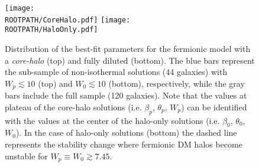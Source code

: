 \begin{figure}
	\centering%
	\texttt{[image: \\ROOTPATH/CoreHalo.pdf]}
	\texttt{[image: \\ROOTPATH/HaloOnly.pdf]}
	\caption{Distribution of the best-fit parameters for the fermionic model with a \textit{core-halo} (top) and fully diluted (bottom). The blue bars represent the sub-sample of non-isothermal solutions (44 galaxies) with $W_p \lesssim 10$ (top) and $W_0 \lesssim 10$ (bottom), respectively, while the gray bars include the full sample (120 galaxies). Note that the values at plateau of the core-halo solutions (i.e. $\beta_p$, $\theta_p$, $W_p$) can be identified with the values at the center of the halo-only solutions (i.e. $\beta_0$, $\theta_0$, $W_0$). In the case of halo-only solutions (bottom) the dashed line represents the stability change where fermionic DM halos become unstable for $W_p\equiv W_0 \gtrsim 7.45$. \citep{2015PhRvD..91f3531C}}%
	\label{fig:parameter-distribution:mepp}%
\end{figure}

